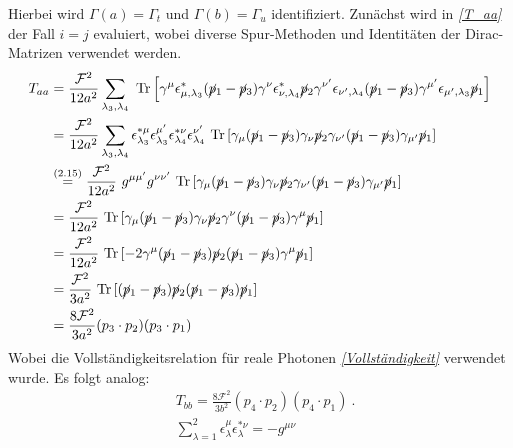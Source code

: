 Hierbei wird $\Gamma(a) = \Gamma_t$ und $ \Gamma(b) = \Gamma_u$ identifiziert. Zunächst wird in \textit{\autoref{T_aa}} der Fall $i = j$ evaluiert, wobei diverse Spur-Methoden und Identitäten der Dirac-Matrizen verwendet werden.
\begin{equation}
\begin{aligned}
T_{aa} &= \frac{\mathcal{F}^2}{12a^2} \sum_{\lambda_3, \lambda_4}~\text{Tr}\left[ \gamma^\mu \epsilon^*_{\mu,\lambda_3} (\cancel{p}_1- \cancel{p}_3)  \gamma^\nu \epsilon_{\nu, \lambda_4}^* \cancel{p}_2 \gamma^{\nu'} \epsilon_{\nu', \lambda_4} (\cancel{p}_1- \cancel{p}_3)  \gamma^{\mu'} \epsilon_{\mu', \lambda_3} \cancel{p}_1 \right] \\
&= \frac{\mathcal{F}^2}{12a^2} \sum_{\lambda_3, \lambda_4}\epsilon^{*\mu}_{\lambda_3}\epsilon^{\mu'} _{\lambda_3} \epsilon^{*\nu}_{\lambda_4}\epsilon^{\nu'}_{\lambda_4}~\text{Tr}\left[ \gamma_\mu (\cancel{p}_1- \cancel{p}_3)  \gamma_\nu \cancel{p}_2 \gamma_{\nu'} (\cancel{p}_1- \cancel{p}_3)  \gamma_{\mu'} \cancel{p}_1\right]\\
&\overset{\text{(2.15)}}{=}\frac{\mathcal{F}^2}{12a^2}~g^{\mu\mu'}g^{\nu\nu'}~\text{Tr}\left[ \gamma_\mu (\cancel{p}_1- \cancel{p}_3)  \gamma_\nu \cancel{p}_2 \gamma_{\nu'} (\cancel{p}_1- \cancel{p}_3)  \gamma_{\mu'} \cancel{p}_1\right] \\
&=\frac{\mathcal{F}^2}{12a^2}~\text{Tr}\left[ \gamma_\mu (\cancel{p}_1- \cancel{p}_3)  \gamma_\nu \cancel{p}_2 \gamma^{\nu} (\cancel{p}_1- \cancel{p}_3)  \gamma^{\mu} \cancel{p}_1\right]\\
&=\frac{\mathcal{F}^2}{12a^2}~\text{Tr}\left[-2\gamma^\mu(\cancel{p}_1- \cancel{p}_3) \cancel{p}_2 (\cancel{p}_1- \cancel{p}_3)\gamma^\mu \cancel{p}_1\right] \\
&=\frac{\mathcal{F}^2}{3a^2}~\text{Tr}\left[(\cancel{p}_1- \cancel{p}_3) \cancel{p}_2 (\cancel{p}_1- \cancel{p}_3)\cancel{p}_1\right] \\
&=\frac{8\mathcal{F}^2}{3a^2}(p_3\cdot p_2)(p_3\cdot p_1)
\end{aligned}
\label{T_aa}
\end{equation}
Wobei die Vollständigkeitsrelation für reale Photonen \textit{\autoref{Vollständigkeit}} verwendet wurde. Es folgt analog:
\begin{align}
&T_{bb} = \frac{8\mathcal{F}^2}{3b^2}(p_4\cdot p_2)(p_4\cdot p_1)~. \\
&\sum_{\lambda = 1}^{2} \epsilon^\mu_{\lambda} \epsilon^{*\nu}_{\lambda} = -g^{\mu \nu}
\label{Vollständigkeit}
\end{align}
